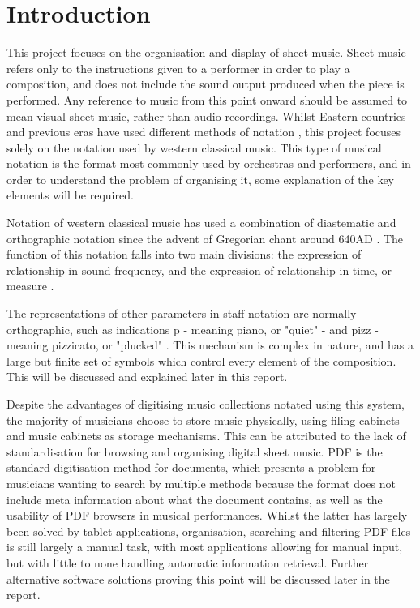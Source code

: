 \section{Introduction}
This project focuses on the organisation and display of sheet music. Sheet music refers only to the instructions given to a performer in order to play a composition, and does not include the sound output produced when the piece is performed. Any reference to music from this point onward should be assumed to mean visual sheet music, rather than audio recordings.
Whilst Eastern countries and previous eras have used different methods of notation \parencite{Kaufman}, this project focuses solely on the notation used by western classical music. This type of musical notation is the format most commonly used by orchestras and performers, and in order to understand the problem of organising it, some explanation of the key elements will be required.

Notation of western classical music has used a combination of diastematic and orthographic notation \parencite{RRastall} since the advent of Gregorian chant around 640AD \parencite{RTaruskin}. The function of this notation falls into two main divisions: the expression of relationship in sound frequency, and the expression of relationship in time, or measure \parencite{oxHistory}.

The representations of other parameters in staff notation are normally orthographic, such as indications p - meaning piano, or "quiet" - and pizz - meaning pizzicato, or "plucked" \parencite{RRastall}. This mechanism is complex in nature, and has a large but finite set of symbols which control every element of the composition. This will be discussed and explained later in this report.

Despite the advantages of digitising music collections notated using this system, the majority of musicians choose to store music physically, using filing cabinets and music cabinets as storage mechanisms\parencite{musicOrganising}. This can be attributed to the lack of standardisation for browsing and organising digital sheet music. PDF is the standard digitisation method for documents, which presents a problem for musicians wanting to search by multiple methods because the format does not include meta information about what the document contains,\parencite{MusicXMLPresentation} as well as the usability of PDF browsers in musical performances. Whilst the latter has largely been solved by tablet applications\parencite{forScore}, organisation, searching and filtering PDF files is still largely a manual task, with most applications allowing for manual input, but with little to none handling automatic information retrieval\parencite{musicReader}. Further alternative software solutions proving this point will be discussed later in the report.

